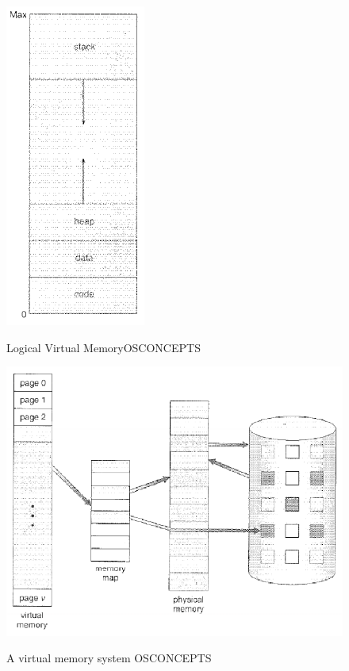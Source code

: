 \documentclass[10pt,a4paper]{article}
\begin{document}
\begin{figure}
\caption{Logical Virtual Memory{OSCONCEPTS}}
\begin{center}
\includegraphics[scale=0.45]{../images/virtmem-log.png}
\label{virtmem-log}
\end{center}
\end{figure}
\begin{figure}
\caption{A virtual memory system {OSCONCEPTS}}
\begin{center}
\includegraphics[scale=0.45]{../images/virtmem.png}
\label{virtmem}
\end{center}
\end{figure}
\end{document}
